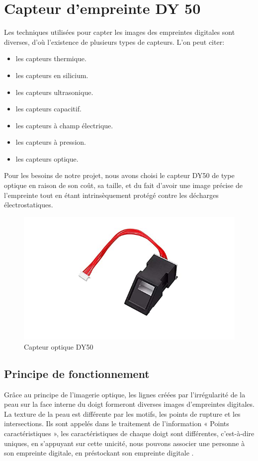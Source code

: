 \section{Capteur d'empreinte DY 50}
Les techniques utilisées pour capter les images des empreintes digitales sont 
diverses, d’où l’existence de plusieurs types de capteurs. L'on peut citer:

\begin{itemize}
    \item les capteurs thermique.
    \item les capteurs en silicium.
    \item les capteurs ultrasonique.
    \item les capteurs capacitif.
    \item les capteurs à champ électrique.
    \item les capteurs à pression.
    \item les capteurs optique.
\end{itemize}

Pour les besoins de notre projet, nous avons choisi le capteur DY50 de type
optique en raison de son coût, sa taille, et du fait d’avoir une image précise
de l’empreinte tout en étant intrinsèquement protégé contre les décharges
électrostatiques.


\begin{figure}[h!]
    \centering
    \includegraphics[scale=0.66]{images/dy50.jpg}
    \vspace{-36pt}
    \caption{Capteur optique DY50}
    \label{fig51}
\end{figure}

\subsection{Principe de fonctionnement}
Grâce au principe de l’imagerie optique, les lignes créées par l’irrégularité de 
la peau sur la face interne du doigt formeront diverses images d’empreintes 
digitales. La texture de la peau est différente par les motifs, les points de 
rupture et les intersections. Ils sont appelés dans le traitement de 
l’information « Points caractéristiques », les caractéristiques de chaque 
doigt sont différentes, c’est-à-dire uniques, en s’appuyant sur cette unicité, 
nous pouvons associer une personne à son empreinte digitale, en préstockant son 
empreinte digitale \cite{34}.

